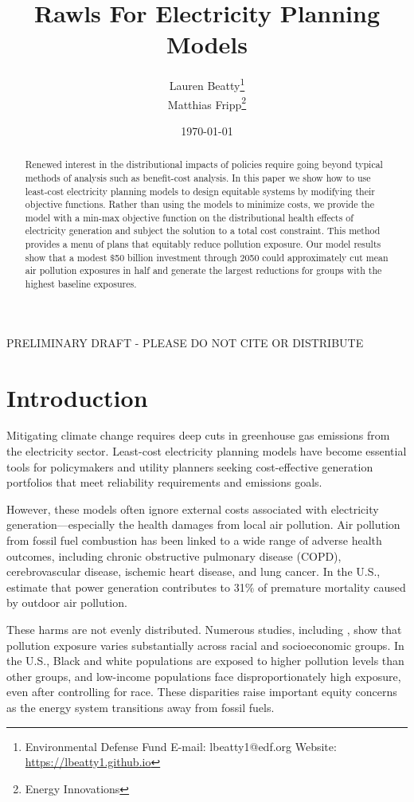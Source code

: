 \documentclass[a4paper]{article}
\title{Rawls For Electricity Planning Models}
\author{Lauren Beatty\thanks{Environmental Defense Fund  \hspace{.5cm} E-mail: lbeatty1@edf.org \hspace{.5cm}Website: \href{https://lbeatty1.github.io}{https://lbeatty1.github.io}}\\
Matthias Fripp\thanks{Energy Innovations}}
\date{\today}
\theoremstyle{definition}
\theoremstyle{plain}
\begin{document}
\maketitle
\begin{center}
    PRELIMINARY DRAFT - PLEASE DO NOT CITE OR DISTRIBUTE
\end{center}

\begin{abstract}
Renewed interest in the distributional impacts of policies require going beyond typical methods of analysis such as benefit-cost analysis.  In this paper we show how to use least-cost electricity planning models to design equitable systems by modifying their objective functions.  Rather than using the models to minimize costs, we provide the model with a min-max objective function on the distributional health effects of electricity generation and subject the solution to a total cost constraint.  This method provides a menu of plans that equitably reduce pollution exposure. Our model results show that a modest $\$$50 billion investment through 2050 could approximately cut mean air pollution exposures in half and generate the largest reductions for groups with the highest baseline exposures.
\end{abstract}


\newpage
\section{Introduction}
Mitigating climate change requires deep cuts in greenhouse gas emissions from the electricity sector. Least-cost electricity planning models have become essential tools for policymakers and utility planners seeking cost-effective generation portfolios that meet reliability requirements and emissions goals.

However, these models often ignore external costs associated with electricity generation—especially the health damages from local air pollution. Air pollution from fossil fuel combustion has been linked to a wide range of adverse health outcomes, including chronic obstructive pulmonary disease (COPD), cerebrovascular disease, ischemic heart disease, and lung cancer. In the U.S., \citet{Lelieveld2015TheScale} estimate that power generation contributes to 31$\%$ of premature mortality caused by outdoor air pollution.

These harms are not evenly distributed. Numerous studies, including \citet{Thind2019FineGeography}, show that pollution exposure varies substantially across racial and socioeconomic groups. In the U.S., Black and white populations are exposed to higher pollution levels than other groups, and low-income populations face disproportionately high exposure, even after controlling for race. These disparities raise important equity concerns as the energy system transitions away from fossil fuels.
\end{document}
